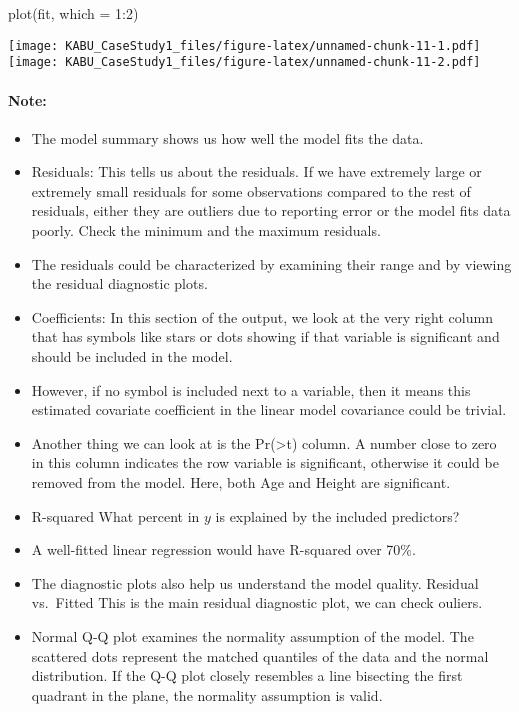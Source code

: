 \documentclass[
]{article}
\newenvironment{Shaded}{\begin{snugshade}}{\end{snugshade}}
\newcommand{\AttributeTok}[1]{\textcolor[rgb]{0.77,0.63,0.00}{#1}}
\newcommand{\DecValTok}[1]{\textcolor[rgb]{0.00,0.00,0.81}{#1}}
\newcommand{\FunctionTok}[1]{\textcolor[rgb]{0.00,0.00,0.00}{#1}}
\newcommand{\NormalTok}[1]{#1}
\newcommand{\SpecialCharTok}[1]{\textcolor[rgb]{0.00,0.00,0.00}{#1}}
\begin{document}
\begin{Shaded}
\begin{Highlighting}[]
\FunctionTok{plot}\NormalTok{(fit, }\AttributeTok{which =} \DecValTok{1}\SpecialCharTok{:}\DecValTok{2}\NormalTok{)}
\end{Highlighting}
\end{Shaded}

\texttt{[image: KABU\_CaseStudy1\_files/figure-latex/unnamed-chunk-11-1.pdf]}
\texttt{[image: KABU\_CaseStudy1\_files/figure-latex/unnamed-chunk-11-2.pdf]}

\hypertarget{note}{%
\paragraph{Note:}\label{note}}

\begin{itemize}
\item
  The model summary shows us how well the model fits the data.
\item
  Residuals: This tells us about the residuals. If we have extremely
  large or extremely small residuals for some observations compared to
  the rest of residuals, either they are outliers due to reporting error
  or the model fits data poorly. Check the minimum and the maximum
  residuals.
\item
  The residuals could be characterized by examining their range and by
  viewing the residual diagnostic plots.
\item
  Coefficients: In this section of the output, we look at the very right
  column that has symbols like stars or dots showing if that variable is
  significant and should be included in the model.
\item
  However, if no symbol is included next to a variable, then it means
  this estimated covariate coefficient in the linear model covariance
  could be trivial.
\item
  Another thing we can look at is the Pr(\textgreater\textbar t\textbar)
  column. A number close to zero in this column indicates the row
  variable is significant, otherwise it could be removed from the model.
  Here, both Age and Height are significant.
\item
  R-squared What percent in \(y\) is explained by the included
  predictors?
\item
  A well-fitted linear regression would have R-squared over 70\%.
\item
  The diagnostic plots also help us understand the model quality.
  Residual vs.~Fitted This is the main residual diagnostic plot, we can
  check ouliers.
\item
  Normal Q-Q plot examines the normality assumption of the model. The
  scattered dots represent the matched quantiles of the data and the
  normal distribution. If the Q-Q plot closely resembles a line
  bisecting the first quadrant in the plane, the normality assumption is
  valid.
\end{itemize}
\end{document}
